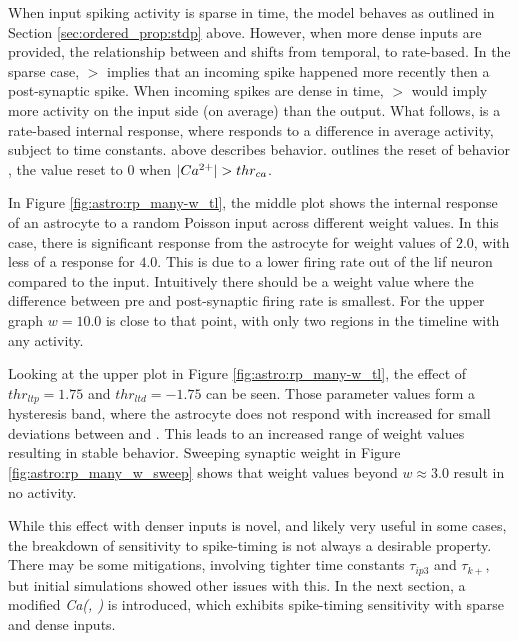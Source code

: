 When input spiking activity is sparse in time, the model behaves as outlined
in Section \ref{sec:ordered_prop:stdp} above. However, when more dense
inputs are provided, the relationship between \ipt and \kp shifts from
temporal, to rate-based. In the sparse case, \ipt $>$ \kp implies that an
incoming spike happened more recently then a post-synaptic spike. When
incoming spikes are dense in time, \ipt $>$ \kp would imply more activity on
the input side (on average) than the output. What follows, is a rate-based
internal response, where \ca responds to a difference in average activity,
subject to time constants.  above describes \ca
behavior.  outlines the reset of behavior \ca,
the value reset to $0$ when $|Ca^{2+}| > thr_{ca}$.

In Figure \ref{fig:astro:rp_many-w_tl}, the middle plot shows the internal
response of an astrocyte to a random Poisson input across different weight values. In
this case, there is significant response from the astrocyte for weight values of
$2.0$, with less of a response for $4.0$. This is due to a lower firing rate out
of the \gls{lif} neuron compared to the input. Intuitively there should be a weight
value where the difference between pre and post-synaptic firing rate is
smallest. For the upper graph $w=10.0$ is close to that point, with only two
regions in the timeline with any activity.


Looking at the upper plot in Figure \ref{fig:astro:rp_many-w_tl}, the effect of
$thr_{ltp}=1.75$ and $thr_{ltd}=-1.75$ can be seen. Those parameter values form
a hysteresis band, where the astrocyte does not respond with increased \ca for
small deviations between \ipt and \kp. This leads to an increased range of
weight values resulting in stable behavior. Sweeping synaptic weight in Figure
\ref{fig:astro:rp_many_w_sweep} shows that weight values beyond $w \approx 3.0$
result in no \ca activity.


While this effect with denser inputs is novel, and likely very useful in some
cases, the breakdown of sensitivity to spike-timing is not always a desirable
property. There may be some mitigations, involving tighter time constants
$\tau_{ip3}$ and $\tau_{k+}$, but initial simulations showed other issues with
this. In the next section, a modified \emph{Ca(\ipt, \kp)} is introduced, which
exhibits spike-timing sensitivity with sparse and dense inputs.

